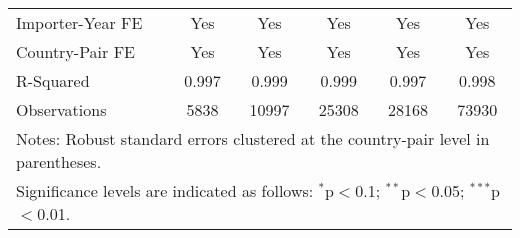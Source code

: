 \begin{table}[htbp]
\begin{adjustbox}{max width=\textwidth}
\begin{tabular}{lccccc}
    Importer-Year FE & Yes & Yes & Yes & Yes & Yes \\
    Country-Pair FE & Yes & Yes & Yes & Yes & Yes \\
    R-Squared & 0.997 & 0.999 & 0.999 & 0.997 & 0.998 \\
    Observations & 5838 & 10997 & 25308 & 28168 & 73930 \\
    \hline
    \multicolumn{6}{l}{\footnotesize{Notes: Robust standard errors clustered at the country-pair level in parentheses.}} \\
    \multicolumn{6}{l}{\footnotesize{Significance levels are indicated as follows: $^{\ast}$p$<$0.1; $^{\ast\ast}$p$<$0.05; $^{\ast\ast\ast}$p$<$0.01.}} \\
    \end{tabular}
    \end{adjustbox}
\end{table}
